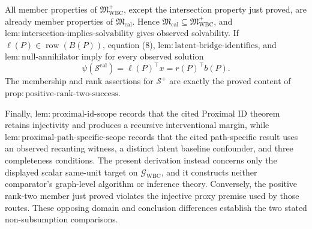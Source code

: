 All member properties of \(\mathfrak M_{\mathrm{WBC}}^+\), except the intersection
property just proved, are already member properties of
\(\mathfrak M_{\mathrm{cal}}\).  Hence
\(\mathfrak M_{\mathrm{cal}}\subseteq\mathfrak M_{\mathrm{WBC}}^+\), and
\(\mathrm{lem{:}intersection\text{-}implies\text{-}solvability}\) gives observed
solvability.  If \(\ell(P)\in\operatorname{row}(B(P))\), equation (8),
\(\mathrm{lem{:}latent\text{-}bridge\text{-}identifies}\), and
\(\mathrm{lem{:}null\text{-}annihilator}\) imply for every observed solution
\[
 \psi(\mathcal S^{\mathrm{cal}})=\ell(P)^\top x=r(P)^\top b(P).
\]
The membership and rank assertions for \(\mathcal S^+\) are exactly the proved
content of \(\mathrm{prop{:}positive\text{-}rank\text{-}two\text{-}success}\).

Finally, \(\mathrm{lem{:}proximal\text{-}id\text{-}scope}\) records that the cited
Proximal ID theorem retains injectivity and produces a recursive interventional
margin, while \(\mathrm{lem{:}proximal\text{-}path\text{-}specific\text{-}scope}\)
records that the cited path-specific result uses an observed recanting witness, a
distinct latent baseline confounder, and three completeness conditions.  The
present derivation instead concerns only the displayed scalar same-unit target on
\(\mathcal G_{\mathrm{WBC}}\), and it constructs neither comparator's graph-level
algorithm or inference theory.  Conversely, the positive rank-two member just
proved violates the injective proxy premise used by those routes.  These opposing
domain and conclusion differences establish the two stated non-subsumption
comparisons.